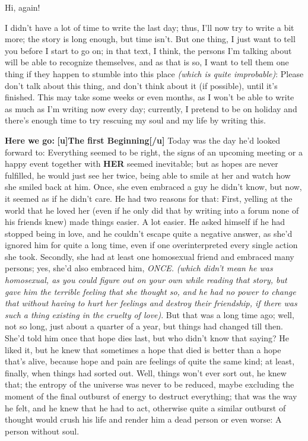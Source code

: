 Hi, again!

I didn't have a lot of time to write the last day; thus, I'll now try to write a bit more; the story is long enough, but time isn't. 
But one thing, I just want to tell you before I start to go on; in that text, I think, the persons I'm talking about will be able to recognize themselves, and as that is so, I want to tell them one thing if they happen to stumble into this place \emph{(which is quite improbable)}: Please don't talk about this thing, and don't think about it (if possible), until it's finished. This may take some weeks or even months, as I won't be able to write as much as I'm writing now every day; currently, I pretend to be on holiday and there's enough time to try rescuing my soul and my life by writing this. 

\textbf{Here we go:}
\textbf{[u]The first Beginning[/u]}
Today was the day he'd looked forward to: Everything seemed to be right, the signs of an upcoming meeting or a happy event together with \textbf{HER} seemed inevitable; but as hopes are never fulfilled, he would just see her twice, being able to smile at her and watch how she smiled back at him. Once, she even embraced a guy he didn't know, but now, it seemed as if he didn't care. He had two reasons for that: First, yelling at the world that he loved her (even if he only did that by writing into a forum none of his friends knew) made things easier. A lot easier. He asked himself if he had stopped being in love, and he couldn't escape quite a negative answer, as she'd ignored him for quite a long time, even if one overinterpreted every single action she took. Secondly, she had at least one homosexual friend and embraced many persons; yes, she'd also embraced him, \emph{ONCE.} \emph{(which didn't mean he was homosexual, as you could figure out on your own while reading that story, but gave him the terrible feeling that she thought so, and he had no power to change that without having to hurt her feelings and destroy their friendship, if there was such a thing existing in the cruelty of love)}. But that was a long time ago; well, not so long, just about a quarter of a year, but things had changed till then. She'd told him once that hope dies last, but who didn't know that saying? He liked it, but he knew that sometimes a hope that died is better than a hope that's alive, because hope and pain are feelings of quite the same kind; at least, finally, when things had sorted out. Well, things won't ever sort out, he knew that; the entropy of the universe was never to be reduced, maybe excluding the moment of the final outburst of energy to destruct everything; that was the way he felt, and he knew that he had to act, otherwise quite a similar outburst of thought would crush his life and render him a dead person or even worse: A person without soul. 
